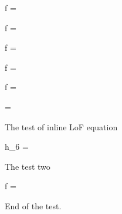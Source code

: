 \documentclass[a4paper]{article}
\theoremstyle{remark}
\begin{document}
\begin{form}
	f =  
\end{form}

\begin{form}
	f =   
\end{form}

\begin{form}
	f = 
\end{form}

\begin{form}
	f = 
\end{form}

\begin{form}
	f = 
\end{form}

\begin{form}
\end{form}

\begin{form}
\end{form}

\begin{form}
\end{form}

\begin{form}
	 = 
\end{form}

The test of inline LoF equation \begin{forminline}
	h_6 = 
\end{forminline} The test two \begin{forminline}
	f = 
\end{forminline} End of the test.   
\end{document}
